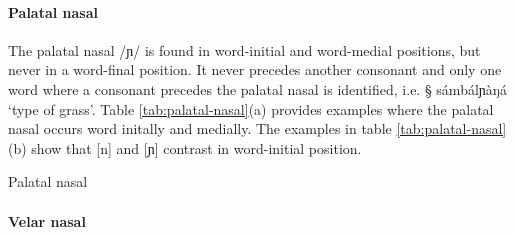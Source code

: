 \paragraph{Palatal nasal}

The palatal nasal /ɲ/ is found in word-initial  and word-medial positions, but
never in  a word-final position. It never precedes another consonant and only
one word where a consonant precedes the palatal nasal is identified, i.e. {\S
sámbálɲàŋá} `type of grass'.  Table  \ref{tab:palatal-nasal}(a) provides
examples where the palatal nasal occurs word initally and medially. The examples
in table \ref{tab:palatal-nasal}(b)  show that [n] and [ɲ] contrast in
word-initial position.  



\begin{table}[!htb]
\centering
\caption{Palatal nasal\label{tab:palatal-nasal}}

\quad
{}


\end{table}



\paragraph{Velar nasal}
\label{sec:velar-nasal}

